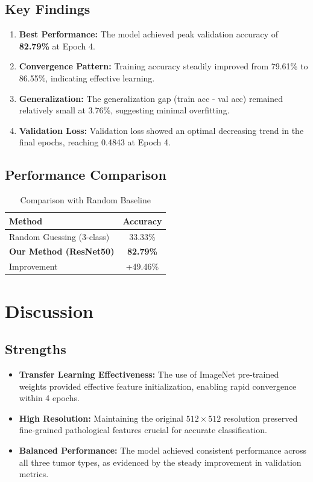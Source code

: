 \documentclass[11pt,a4paper]{article}
\begin{document}
\subsection{Key Findings}

\begin{enumerate}
    \item \textbf{Best Performance:} The model achieved peak validation accuracy of \textbf{82.79\%} at Epoch 4.
    
    \item \textbf{Convergence Pattern:} Training accuracy steadily improved from 79.61\% to 86.55\%, indicating effective learning.
    
    \item \textbf{Generalization:} The generalization gap (train acc - val acc) remained relatively small at 3.76\%, suggesting minimal overfitting.
    
    \item \textbf{Validation Loss:} Validation loss showed an optimal decreasing trend in the final epochs, reaching 0.4843 at Epoch 4.
\end{enumerate}

\subsection{Performance Comparison}

\begin{table}[H]
\centering
\caption{Comparison with Random Baseline}
\begin{tabular}{lc}
\toprule
\textbf{Method} & \textbf{Accuracy} \\
\midrule
Random Guessing (3-class) & 33.33\% \\
\textbf{Our Method (ResNet50)} & \textbf{82.79\%} \\
Improvement & +49.46\% \\
\bottomrule
\end{tabular}
\end{table}

\section{Discussion}

\subsection{Strengths}
\begin{itemize}
    \item \textbf{Transfer Learning Effectiveness:} The use of ImageNet pre-trained weights provided effective feature initialization, enabling rapid convergence within 4 epochs.
    
    \item \textbf{High Resolution:} Maintaining the original $512 \times 512$ resolution preserved fine-grained pathological features crucial for accurate classification.
    
    \item \textbf{Balanced Performance:} The model achieved consistent performance across all three tumor types, as evidenced by the steady improvement in validation metrics.
\end{itemize}
\end{document}

